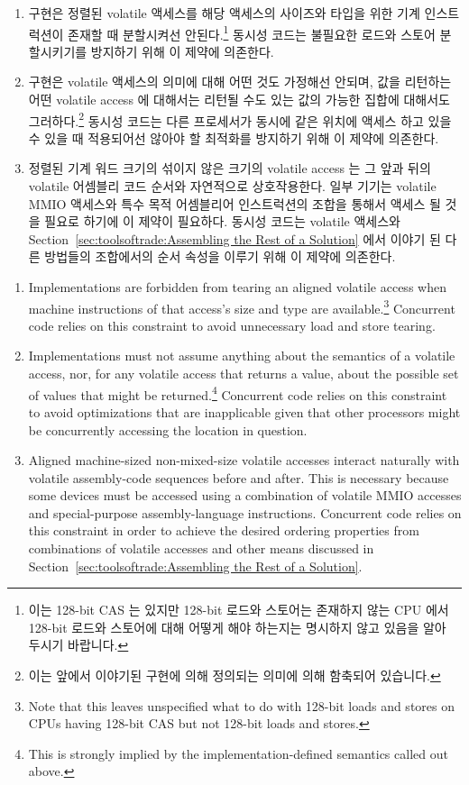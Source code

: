 \begin{enumerate}
\item	구현은 정렬된 volatile 액세스를 해당 액세스의 사이즈와 타입을 위한 기계
	인스트럭션이 존재할 때 분할시켜선 안된다.\footnote{
		이는 128-bit CAS 는 있지만 128-bit 로드와 스토어는 존재하지
		않는 CPU 에서 128-bit 로드와 스토어에 대해 어떻게 해야 하는지는
		명시하지 않고 있음을 알아 두시기 바랍니다.}
	동시성 코드는 불필요한 로드와 스토어 분할시키기를 방지하기 위해 이
	제약에 의존한다.
\item	구현은 volatile 액세스의 의미에 대해 어떤 것도 가정해선 안되며, 값을
	리턴하는 어떤 volatile access 에 대해서는 리턴될 수도 있는 값의 가능한
	집합에 대해서도 그러하다.\footnote{
		이는 앞에서 이야기된 구현에 의해 정의되는 의미에 의해 함축되어
		있습니다.}
	동시성 코드는 다른 프로세서가 동시에 같은 위치에 액세스 하고 있을 수
	있을 때 적용되어선 않아야 할 최적화를 방지하기 위해 이 제약에 의존한다.
\item	정렬된 기계 워드 크기의 섞이지 않은 크기의 volatile access 는 그 앞과
	뒤의 volatile 어셈블리 코드 순서와 자연적으로 상호작용한다.
	일부 기기는 volatile MMIO 액세스와 특수 목적 어셈블리어 인스트럭션의
	조합을 통해서 액세스 될 것을 필요로 하기에 이 제약이 필요하다.
	동시성 코드는 volatile 액세스와
	Section~\ref{sec:toolsoftrade:Assembling the Rest of a Solution}
	에서 이야기 된 다른 방법들의 조합에서의 순서 속성을 이루기 위해 이
	제약에 의존한다.
\end{enumerate}

\iffalse

\begin{enumerate}
\item	Implementations are forbidden from tearing an aligned volatile
	access when machine instructions of that access's size and type
	are available.\footnote{
		Note that this leaves unspecified what to do with 128-bit
		loads and stores on CPUs having 128-bit CAS but not
		128-bit loads and stores.}
	Concurrent code relies on this constraint to avoid unnecessary
	load and store tearing.
\item	Implementations must not assume anything about the semantics of
	a volatile access, nor, for any volatile access that returns a
	value, about the possible set of values that might be
	returned.\footnote{
		This is strongly implied by the implementation-defined
		semantics called out above.}
	Concurrent code relies on this constraint to avoid optimizations
	that are inapplicable given that other processors might be
	concurrently accessing the location in question.
\item	Aligned machine-sized non-mixed-size volatile accesses interact
	naturally with volatile assembly-code sequences before and after.
	This is necessary because some devices must be accessed using
	a combination of volatile MMIO accesses and special-purpose
	assembly-language instructions.
	Concurrent code relies on this constraint in order to achieve
	the desired ordering properties from combinations of volatile
	accesses and other means discussed in
	Section~\ref{sec:toolsoftrade:Assembling the Rest of a Solution}.
\end{enumerate}

